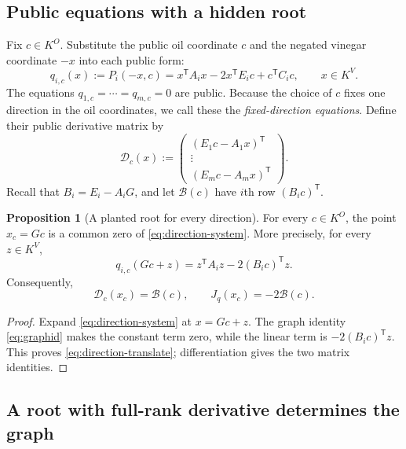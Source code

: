 \documentclass[11pt,a4paper]{article}
\theoremstyle{definition}
\newtheorem{proposition}[theorem]{Proposition}
\theoremstyle{remark}
\begin{document}
\subsection{Public equations with a hidden root}

Fix $c\in K^O$.  Substitute the public oil coordinate $c$ and the negated
vinegar coordinate $-x$ into each public form:
\begin{equation}\label{eq:direction-system}
 q_{i,c}(x):=P_i(-x,c)
 =x^{\mathsf T}A_ix-2x^{\mathsf T}E_ic+c^{\mathsf T}C_ic,
 \qquad x\in K^V.
\end{equation}
The equations $q_{1,c}=\cdots=q_{m,c}=0$ are public.  Because the choice of
$c$ fixes one direction in the oil coordinates, we call these the
\emph{fixed-direction equations}.  Define their public derivative matrix by
\begin{equation}\label{eq:direction-matrix}
 \mathcal D_c(x):=
 \begin{pmatrix}
 (E_1c-A_1x)^{\mathsf T}\\[-1mm]
 \vdots\\[-1mm]
 (E_mc-A_mx)^{\mathsf T}
 \end{pmatrix}.
\end{equation}
Recall that $B_i=E_i-A_iG$, and let $\mathcal B(c)$ have $i$th row
$(B_ic)^{\mathsf T}$.

\begin{proposition}[A planted root for every direction]\label{prop:graph-direction-identity}
For every $c\in K^O$, the point $x_c=Gc$ is a common zero of
\eqref{eq:direction-system}.  More precisely, for every $z\in K^V$,
\begin{equation}\label{eq:direction-translate}
 q_{i,c}(Gc+z)=z^{\mathsf T}A_iz-2(B_ic)^{\mathsf T}z.
\end{equation}
Consequently,
\[
 \mathcal D_c(x_c)=\mathcal B(c),
 \qquad
 J_q(x_c)=-2\mathcal B(c).
\]
\end{proposition}

\begin{proof}
Expand \eqref{eq:direction-system} at $x=Gc+z$.  The graph identity
\eqref{eq:graphid} makes the constant term zero, while the linear term is
$-2(B_ic)^{\mathsf T}z$.  This proves \eqref{eq:direction-translate};
differentiation gives the two matrix identities.
\end{proof}

\subsection{A root with full-rank derivative determines the graph}
\end{document}

